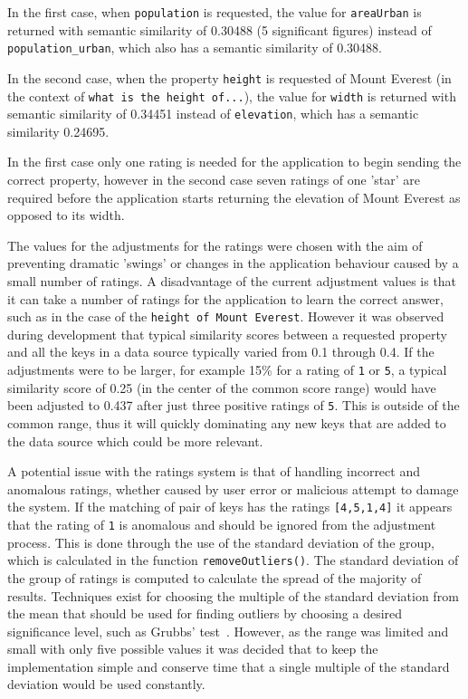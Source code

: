 \documentclass[authoryearcitations]{UoYCSproject}
\begin{document}
In the first case, when \texttt{population} is requested, the value for \texttt{areaUrban} is returned with semantic similarity of 0.30488 (5 significant figures) instead of \texttt{population\_urban}, which also has a semantic similarity of 0.30488.

In the second case, when the property \texttt{height} is requested of Mount Everest (in the context of \texttt{what is the height of...}), the value for \texttt{width} is returned with semantic similarity of 0.34451 instead of \texttt{elevation}, which has a semantic similarity 0.24695.

In the first case only one rating is needed for the application to begin sending the correct property, however in the second case seven ratings of one 'star' are required before the application starts returning the elevation of Mount Everest as opposed to its width.

The values for the adjustments for the ratings were chosen with the aim of preventing dramatic 'swings' or changes in the application behaviour caused by a small number of ratings. A disadvantage of the current adjustment values is that it can take a number of ratings for the application to learn the correct answer, such as in the case of the \texttt{height of Mount Everest}. However it was observed during development that typical similarity scores between a requested property and all the keys in a data source typically varied from 0.1 through 0.4.  If the adjustments were to be larger, for example 15\% for a rating of \texttt{1} or \texttt{5}, a typical similarity score of 0.25 (in the center of the common score range) would have been adjusted to 0.437 after just three positive ratings of \texttt{5}. This is outside of the common range, thus it will quickly dominating any new keys that are added to the data source which could be more relevant. 

A potential issue with the ratings system is that of handling incorrect and anomalous ratings, whether caused by user error or malicious attempt to damage the system. If the matching of pair of keys has the ratings \texttt{[4,5,1,4]} it appears that the rating of \texttt{1} is anomalous and should be ignored from the adjustment process. This is done through the use of the standard deviation of the group, which is calculated in the function \texttt{removeOutliers()}. The standard deviation of the group of ratings is computed to calculate the spread of the majority of results. Techniques exist for choosing the multiple of the standard deviation from the mean that should be used for finding outliers by choosing a desired significance level, such as Grubbs' test~\cite{grubbs1969procedures}. However, as the range was limited and small with only five possible values it was decided that to keep the implementation simple and conserve time that a single multiple of the standard deviation would be used constantly.
\end{document}
